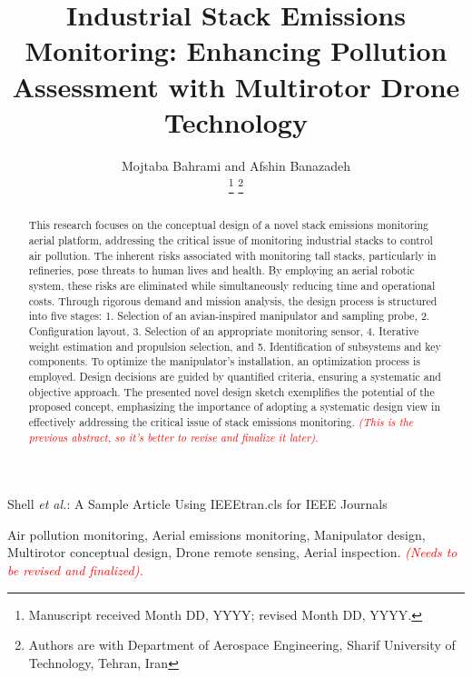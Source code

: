 \documentclass[lettersize,journal]{IEEEtran}
\begin{document}
\title{Industrial Stack Emissions Monitoring: Enhancing Pollution Assessment with Multirotor Drone Technology}
\author{
Mojtaba Bahrami
and
Afshin Banazadeh

\thanks{Manuscript received Month DD, YYYY; revised Month DD, YYYY.}
\thanks{Authors are with Department of Aerospace Engineering, Sharif University of Technology, Tehran, Iran}
}

{Shell \MakeLowercase{\textit{et al.}}: A Sample Article Using IEEEtran.cls for IEEE Journals}


\maketitle

\begin{abstract}
This research focuses on the conceptual design of a novel stack emissions monitoring aerial platform, addressing the critical issue of monitoring industrial stacks to control air pollution. The inherent risks associated with monitoring tall stacks, particularly in refineries, pose threats to human lives and health. By employing an aerial robotic system, these risks are eliminated while simultaneously reducing time and operational costs. Through rigorous demand and mission analysis, the design process is structured into five stages: 1. Selection of an avian-inspired manipulator and sampling probe, 2. Configuration layout, 3. Selection of an appropriate monitoring sensor, 4. Iterative weight estimation and propulsion selection, and 5. Identification of subsystems and key components. To optimize the manipulator's installation, an optimization process is employed. Design decisions are guided by quantified criteria, ensuring a systematic and objective approach. The presented novel design sketch exemplifies the potential of the proposed concept, emphasizing the importance of adopting a systematic design view in effectively addressing the critical issue of stack emissions monitoring. \textcolor{red}{\emph{(This is the previous abstract, so it's better to revise and finalize it later).}}
\end{abstract}

\begin{IEEEkeywords}
Air pollution monitoring, Aerial emissions monitoring, Manipulator design, Multirotor conceptual design, Drone remote sensing, Aerial inspection.
\textcolor{red}{\emph{(Needs to be revised and finalized).}}
\end{IEEEkeywords}
\end{document}
